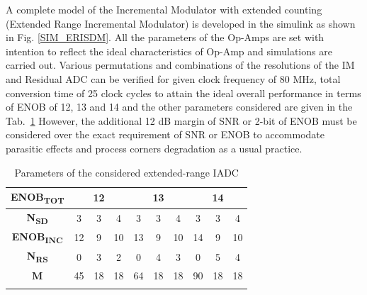A complete model of the Incremental {\textSigma}{\textDelta} Modulator with extended counting (Extended Range Incremental {\textSigma}{\textDelta} Modulator) is developed in the simulink as shown in Fig. \ref{SIM_ERISDM}. All the parameters of the Op-Amps are set with intention to reflect the ideal characteristics of Op-Amp and simulations are carried out. Various permutations and combinations of the resolutions of the I{\textSigma}{\textDelta}M and Residual ADC can be verified for given clock frequency of 80 MHz, total conversion time of 25 clock cycles to attain the ideal overall performance in terms of ENOB of 12, 13 and 14 and the other parameters considered are given in the Tab.~\ref{PARAM}
However, the additional 12 dB margin of SNR or 2-bit of ENOB must be considered over the exact requirement of SNR or ENOB to accommodate parasitic effects and process corners degradation as a usual practice. 


\begin{table}
\centering
\begin{tabular}{c|c|c|c|c|c|c|c|c|c}
\Xhline{4\arrayrulewidth}
\textbf{ENOB\textsubscript{TOT}} & \multicolumn{3}{c|}{\textbf{12}} & \multicolumn{3}{c|}{\textbf{13}} & \multicolumn{3}{c}{\textbf{14}} \\ \hline
\textbf{N\textsubscript{SD}} & 3 & 3 & 4 & 3 & 3 & 4 & 3 & 3 & 4 \\ \hline
\textbf{ENOB\textsubscript{INC}} & 12 & 9 & 10 & 13 & 9 & 10 & 14 & 9 & 10 \\ \hline
\textbf{N\textsubscript{RS}} & 0 & 3 & 2 & 0 & 4 & 3 & 0 & 5 & 4 \\ \hline
\textbf{M} & 45 & 18 & 18 & 64 & 18 & 18 & 90 & 18 & 18 \\ \Xhline{4\arrayrulewidth}
\end{tabular}
\caption{Parameters of the considered extended-range IADC}
\label{PARAM}
\end{table}

